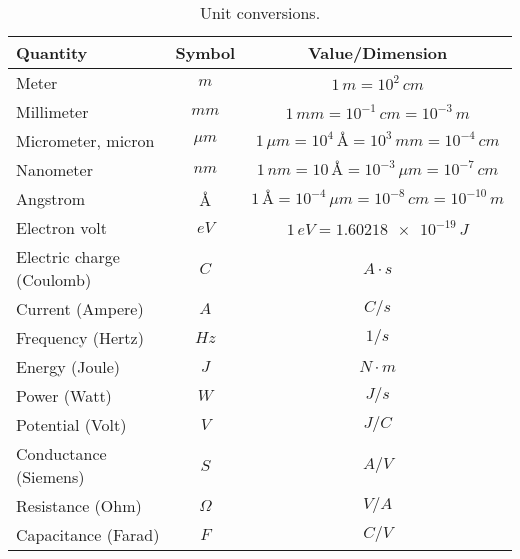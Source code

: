     \begin{table}[H]
    \centering
    \setlength{\tabcolsep}{20pt}
    \renewcommand{\arraystretch}{1.5}
    \begin{tabular}{|l|c|c|}
        \hline
        \textbf{Quantity}  &  \textbf{Symbol} & \textbf{Value/Dimension}\\
        \hline
        Meter & $m$ & $1\,m = 10^2\,cm$\\
        \hline
        Millimeter & $mm$ & $1\,mm = 10^{-1}\,cm = 10^{-3}\,m$\\
        \hline
        Micrometer, micron & $\mu m$ & $1\,\mu m = 10^4\,\text{\AA} = 10^3\,mm = 10^{-4}\,cm$\\
        \hline
        Nanometer & $nm$ & $1\,nm = 10\,\text{\AA} = 10^{-3}\,\mu m = 10^{-7}\,cm$\\
        \hline
        Angstrom & $\text{\AA}$ & $1\,\text{\AA} = 10^{-4}\,\mu m = 10^{-8}\,cm = 10^{-10}\,m$\\
        \hline
        Electron volt & $eV$ & $1\,eV = \num{1.60218e-19}\,J$\\
        \hline
        Electric charge (Coulomb) & $C$ & $A \cdot s$\\
        \hline
        Current (Ampere) & $A$ & $C/s$\\
        \hline
        Frequency (Hertz) & $Hz$ & $1/s$\\
        \hline
        Energy (Joule) & $J$ & $N \cdot m$\\
        \hline
        Power (Watt) & $W$ & $J/s$\\
        \hline
        Potential (Volt) & $V$ & $J/C$\\
        \hline
        Conductance (Siemens) & $S$ & $A/V$\\
        \hline
        Resistance (Ohm) & $\Omega$ & $V/A$\\
        \hline
        Capacitance (Farad) & $F$ & $C/V$\\
        \hline
    \end{tabular}
    \caption{Unit conversions.
    \label{tab:unit_conv}} 
    \end{table}
\newpage